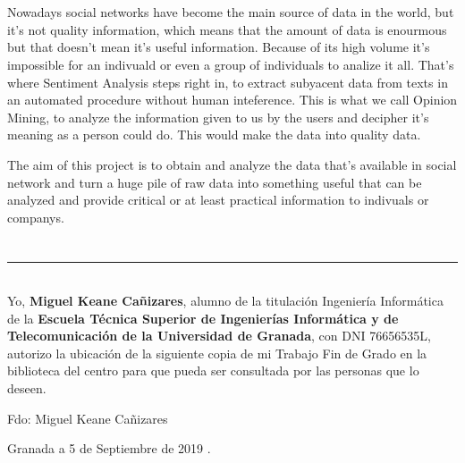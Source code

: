 \\

\vspace{0.7cm}
\\

Nowadays social networks have become the main source of data in the world, but it's not quality information, which means that the amount of data is enourmous but that doesn't mean it's useful information. Because of its high volume it's impossible for an indivuald or even a group of individuals to analize it all. That's where Sentiment Analysis steps right in, to extract subyacent data from texts in an automated procedure without human inteference. This is what we call Opinion Mining, to analyze the information given to us by the users and decipher it's meaning as a person could do. This would make the data into quality data. 

The aim of this project is to obtain and analyze the data that's available in social network and turn a huge pile of raw data into something useful that can be analyzed and provide critical or at least practical information to indivuals or companys. 

\chapter*{}
\thispagestyle{empty}

\noindent\rule[-1ex]{\textwidth}{2pt}\\[4.5ex]

Yo, \textbf{Miguel Keane Cañizares}, alumno de la titulación Ingeniería Informática de la \textbf{Escuela Técnica Superior
de Ingenierías Informática y de Telecomunicación de la Universidad de Granada}, con DNI 76656535L, autorizo la
ubicación de la siguiente copia de mi Trabajo Fin de Grado en la biblioteca del centro para que pueda ser
consultada por las personas que lo deseen.

\vspace{6cm}

\noindent Fdo: Miguel Keane Cañizares

\vspace{2cm}

\begin{flushright}
Granada a 5 de Septiembre de 2019 .
\end{flushright}


